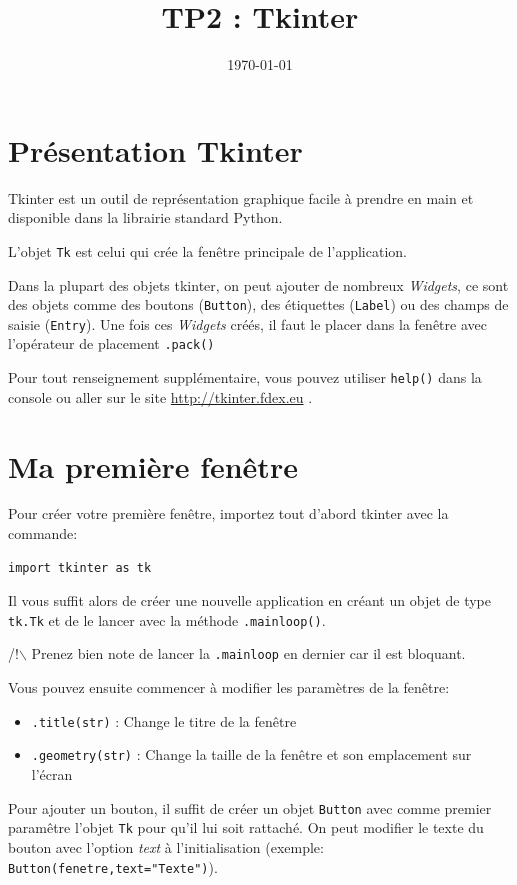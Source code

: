 \documentclass{article}
\date{\today}
\title{TP2 : Tkinter}
\begin{document}
\maketitle


\section{Présentation Tkinter}
\label{sec-1}
Tkinter est un outil de représentation graphique facile à prendre en main et disponible dans la librairie standard Python.

\noindent
L'objet \verb~Tk~ est celui qui crée la fenêtre principale de l'application.

\noindent
Dans la plupart des objets tkinter, on peut ajouter de nombreux \emph{Widgets}, ce sont des objets comme des boutons (\verb~Button~), des étiquettes (\verb~Label~) ou des champs de saisie (\verb~Entry~).
Une fois ces \emph{Widgets} créés, il faut le placer dans la fenêtre avec l'opérateur de placement \verb~.pack()~

\noindent
Pour tout renseignement supplémentaire, vous pouvez utiliser \verb~help()~ dans la console ou aller sur le site \url{http://tkinter.fdex.eu} .

\section{Ma première fenêtre}
\label{sec-2}
Pour créer votre première fenêtre, importez tout d'abord tkinter avec la commande:
\begin{verbatim}
import tkinter as tk
\end{verbatim}

Il vous suffit alors de créer une nouvelle application en créant un objet de type \verb~tk.Tk~ et de le lancer avec la méthode \verb~.mainloop()~.

\noindent
/!$\backslash$ Prenez bien note de lancer la \verb~.mainloop~ en dernier car il est bloquant.


\noindent
Vous pouvez ensuite commencer à modifier les paramètres de la fenêtre:
\begin{itemize}
\item \verb~.title(str)~ : Change le titre de la fenêtre
\item \verb~.geometry(str)~ : Change la taille de la fenêtre et son emplacement sur l'écran
\end{itemize}

\noindent
Pour ajouter un bouton, il suffit de créer un objet \verb~Button~ avec comme premier paramêtre l'objet \verb~Tk~ pour qu'il lui soit rattaché.
On peut modifier le texte du bouton avec l'option \emph{text} à l'initialisation (exemple: \verb~Button(fenetre,text="Texte")~).
\end{document}
